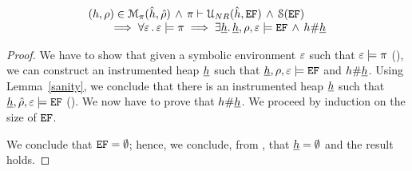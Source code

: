 \begin{lemma}\label{lemma:negative:resource}
$$
\begin{array}{l}
  (h, \rho) \in \mathcal{M}_{\pi}(\hat{h}, \hat\rho) \, \wedge \, \pi \vdash {\cal U}_{NR}(\hat{h}, \mathtt{EF}) \, \wedge \,  {\cal S}(\mathtt{EF}) \\
  \qquad 
      \implies \forall \varepsilon \, . \, \varepsilon \models \pi  \implies \exists \underline{h} . \, \underline{h}, \rho, \varepsilon \models \mathtt{EF} \, \wedge \, h \# \underline{h}
\end{array}
$$
\end{lemma}
\begin{proof}
We have to show that given a symbolic environment $\varepsilon$ such that $\varepsilon \models \pi$ (), 
we can construct an instrumented heap $\underline{h}$ such that $\underline{h}, \rho, \varepsilon \models \mathtt{EF}$ and 
$h \# \underline{h}$. 
Using Lemma~\ref{sanity}, we conclude that there is an instrumented heap $\underline{h}$ such 
that $\underline{h}, \hat\rho, \varepsilon \models \mathtt{EF}$ (). We now have to prove that $h \# \underline{h}$.
We proceed by induction on the size of $\mathtt{EF}$.  
\vspace{6pt}

\noindent{} We conclude that $\mathtt{EF} = \emptyset$; hence, we conclude, from 
, that $\underline{h} = \emptyset$ and the result holds. 
\vspace{6pt}


\end{proof}
